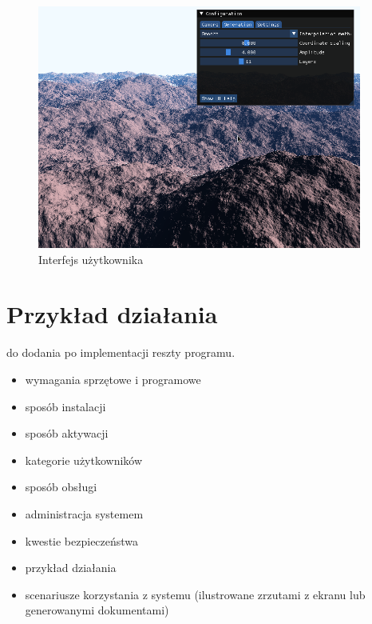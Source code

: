 \begin{figure}
\centering
\includegraphics[width=0.95\textwidth]{./graf/ui.png}
\caption{Interfejs użytkownika}
\label{fig:ui}
\end{figure}

\section{Przykład działania}
do dodania po implementacji reszty programu.


\begin{itemize}
\item  wymagania sprzętowe i programowe
\item  sposób instalacji
\item  sposób aktywacji
\item  kategorie użytkowników
\item  sposób obsługi
\item  administracja systemem
\item  kwestie bezpieczeństwa
\item  przykład działania
\item  scenariusze korzystania z systemu (ilustrowane zrzutami z ekranu lub generowanymi dokumentami)
\end{itemize}

